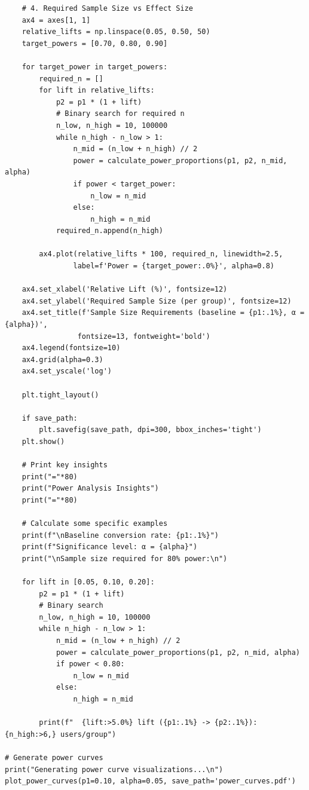 \begin{lstlisting}
    # 4. Required Sample Size vs Effect Size
    ax4 = axes[1, 1]
    relative_lifts = np.linspace(0.05, 0.50, 50)
    target_powers = [0.70, 0.80, 0.90]

    for target_power in target_powers:
        required_n = []
        for lift in relative_lifts:
            p2 = p1 * (1 + lift)
            # Binary search for required n
            n_low, n_high = 10, 100000
            while n_high - n_low > 1:
                n_mid = (n_low + n_high) // 2
                power = calculate_power_proportions(p1, p2, n_mid, alpha)
                if power < target_power:
                    n_low = n_mid
                else:
                    n_high = n_mid
            required_n.append(n_high)

        ax4.plot(relative_lifts * 100, required_n, linewidth=2.5,
                label=f'Power = {target_power:.0%}', alpha=0.8)

    ax4.set_xlabel('Relative Lift (%)', fontsize=12)
    ax4.set_ylabel('Required Sample Size (per group)', fontsize=12)
    ax4.set_title(f'Sample Size Requirements (baseline = {p1:.1%}, α = {alpha})',
                 fontsize=13, fontweight='bold')
    ax4.legend(fontsize=10)
    ax4.grid(alpha=0.3)
    ax4.set_yscale('log')

    plt.tight_layout()

    if save_path:
        plt.savefig(save_path, dpi=300, bbox_inches='tight')
    plt.show()

    # Print key insights
    print("="*80)
    print("Power Analysis Insights")
    print("="*80)

    # Calculate some specific examples
    print(f"\nBaseline conversion rate: {p1:.1%}")
    print(f"Significance level: α = {alpha}")
    print("\nSample size required for 80% power:\n")

    for lift in [0.05, 0.10, 0.20]:
        p2 = p1 * (1 + lift)
        # Binary search
        n_low, n_high = 10, 100000
        while n_high - n_low > 1:
            n_mid = (n_low + n_high) // 2
            power = calculate_power_proportions(p1, p2, n_mid, alpha)
            if power < 0.80:
                n_low = n_mid
            else:
                n_high = n_mid

        print(f"  {lift:>5.0%} lift ({p1:.1%} -> {p2:.1%}): {n_high:>6,} users/group")

# Generate power curves
print("Generating power curve visualizations...\n")
plot_power_curves(p1=0.10, alpha=0.05, save_path='power_curves.pdf')
\end{lstlisting}

